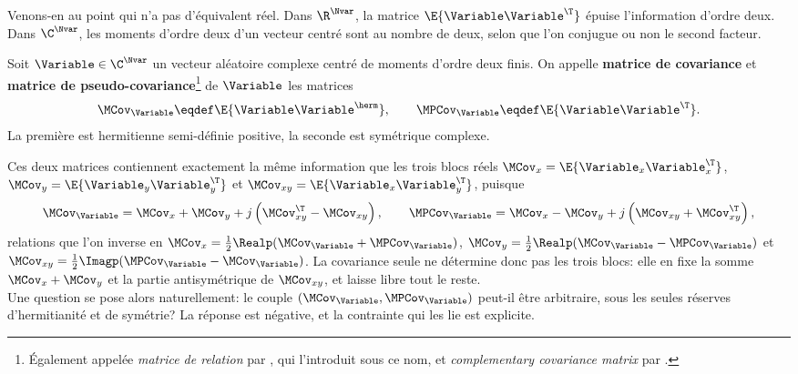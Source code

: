 Venons-en au point qui n'a pas d'équivalent réel. Dans $\R^\Nvar$, la matrice $\E\{\Variable\Variable^\T\}$ épuise l'information d'ordre deux. Dans $\C^\Nvar$, les moments d'ordre deux d'un vecteur centré sont au nombre de deux, selon que l'on conjugue ou non le second facteur.

\begin{definition}
\label{def:context-complex-pseudocov}
  Soit $\Variable\in\C^\Nvar$ un vecteur aléatoire complexe centré de moments d'ordre deux finis. On appelle \textbf{matrice de covariance} et \textbf{matrice de pseudo-covariance}\footnote{Également appelée \emph{matrice de relation} par \cite{Picinbono1996}, qui l'introduit sous ce nom, et \emph{complementary covariance matrix} par \cite{SchreierScharf2010}.} de $\Variable$ les matrices
\begin{equation}
  \MCov_\Variable \eqdef \E\{\Variable\Variable^\herm\},
  \qquad
  \MPCov_\Variable \eqdef \E\{\Variable\Variable^\T\}.
  \label{eq:context-complex-covpcov}
\end{equation}
  La première est hermitienne semi-définie positive, la seconde est symétrique complexe.
\end{definition}

Ces deux matrices contiennent exactement la même information que les trois blocs réels $\MCov_x=\E\{\Variable_x\Variable_x^\T\}$, $\MCov_y=\E\{\Variable_y\Variable_y^\T\}$ et $\MCov_{xy}=\E\{\Variable_x\Variable_y^\T\}$, puisque
\begin{equation}
  \MCov_\Variable = \MCov_x + \MCov_y + j\left(\MCov_{xy}^\T - \MCov_{xy}\right),
  \qquad
  \MPCov_\Variable = \MCov_x - \MCov_y + j\left(\MCov_{xy} + \MCov_{xy}^\T\right),
  \label{eq:context-complex-blocs}
\end{equation}
relations que l'on inverse en $\MCov_x = \frac12\Realp(\MCov_\Variable+\MPCov_\Variable)$, $\MCov_y = \frac12\Realp(\MCov_\Variable-\MPCov_\Variable)$ et $\MCov_{xy} = \frac12\Imagp(\MPCov_\Variable-\MCov_\Variable)$. La covariance seule ne détermine donc pas les trois blocs: elle en fixe la somme $\MCov_x+\MCov_y$ et la partie antisymétrique de $\MCov_{xy}$, et laisse libre tout le reste. \\

Une question se pose alors naturellement: le couple $(\MCov_\Variable,\MPCov_\Variable)$ peut-il être arbitraire, sous les seules réserves d'hermitianité et de symétrie? La réponse est négative, et la contrainte qui les lie est explicite.

